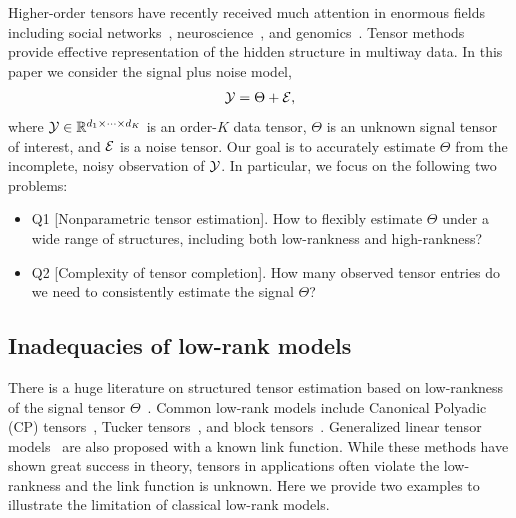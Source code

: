 \documentclass[twoside,11pt]{article}
\theoremstyle{plain}
\theoremstyle{definition}
\begin{document}
Higher-order tensors have recently received much attention in enormous fields including social networks~\citep{anandkumar2014tensor}, neuroscience~\citep{wang2017bayesian}, and genomics~\citep{hore2016tensor}. Tensor methods provide effective representation of the hidden structure in multiway data. In this paper we consider the signal plus noise model,
\begin{equation}\label{eq:modelintro}
\mathcal{Y}=\Theta+\mathcal{E},
\end{equation}
where $\mathcal{Y}\in\mathbb{R}^{d_1\times \cdots \times d_K}$ is an order-$K$ data tensor, $\Theta$ is an unknown signal tensor of interest, and $\mathcal{E}$ is a noise tensor. Our goal is to accurately estimate $\Theta$ from the incomplete, noisy observation of $\mathcal{Y}$. In particular, we focus on the following two problems:
\begin{itemize}[leftmargin=*,labelindent=-10pt]
\item[] Q1 [Nonparametric tensor estimation]. How to flexibly estimate $\Theta$ under a wide range of structures, including both low-rankness and high-rankness?
\item[] Q2 [Complexity of tensor completion]. How many observed tensor entries do we need to consistently estimate the signal $\Theta$?
\end{itemize}


\subsection{Inadequacies of low-rank models}\label{sec:inadequcies}
 There is a huge literature on structured tensor estimation based on low-rankness of the signal tensor $\Theta$~\citep{jain2014provable,montanari2018spectral}. Common low-rank models include Canonical Polyadic (CP) tensors~\citep{hitchcock1927expression}, Tucker tensors~\citep{de2000multilinear}, and block tensors~\citep{wang2019multiway}.   Generalized linear tensor models~\citep{wang2018learning,hu2021generalized} are also proposed  with a known link function. 
While these methods have shown great success in theory, tensors in applications often violate the low-rankness and the link function is unknown. Here we provide two examples to illustrate the limitation of classical low-rank models.
\end{document}
